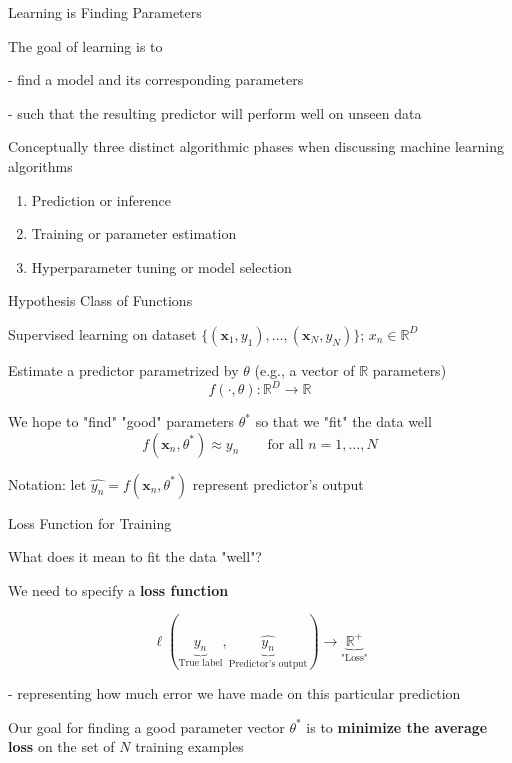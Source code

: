 \documentclass[12pt]{beamer}
\begin{document}
\begin{frame}{Learning is Finding Parameters}

\begin{block}{The goal of learning is to}

- find a model and its corresponding parameters

- such that the resulting predictor will perform well on unseen data
\end{block}


Conceptually three distinct algorithmic phases when discussing machine learning algorithms

\begin{enumerate}
\item Prediction or inference
\item Training or parameter estimation
\item Hyperparameter tuning or model selection	
\end{enumerate}

\end{frame}

\begin{frame}{Hypothesis Class of Functions}

Supervised learning on dataset $\{(\mathbf{x}_1, y_1), \dots,  (\mathbf{x}_N, y_N)\}$; $x_n \in \mathbb{R}^D$

Estimate a predictor parametrized by $\theta$ (e.g., a vector of $\mathbb{R}$ parameters)
$$
f(\cdot, \theta): \mathbb{R}^D \to \mathbb{R}
$$

We hope to "find" "good" parameters $\theta^*$ so that we "fit" the data well
$$
f(\mathbf{x}_n, \theta^*) \approx y_n \qquad \text{for all } n = 1, \dots, N
$$

Notation: let $\hat{y_n} = f(\mathbf{x}_n, \theta^*)$ represent predictor's output

\end{frame}

\begin{frame}{Loss Function for Training}

What does it mean to fit the data "well"?

We need to specify a \textbf{loss function}

$$
\ell(\underbrace{y_n}_{\text{True label}}, \underbrace{\hat{y_n}}_{\text{Predictor's output}}) \to \underbrace{\mathbb{R}^{+}}_{\text{"Loss"}}
$$

- representing how much error we have made on this particular prediction

Our goal for finding a good parameter vector $\theta^*$ is to \textbf{minimize the average loss} on the set of $N$ training examples


\end{frame}
\end{document}
